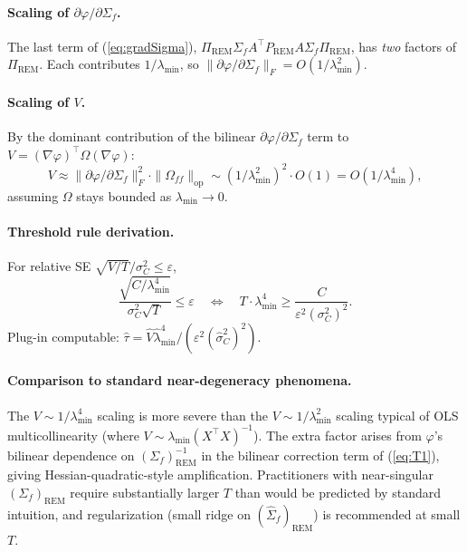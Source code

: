 \documentclass[11pt,letterpaper]{article}
\theoremstyle{remark}
\newcommand{\REM}{\mathrm{REM}}
\newcommand{\Sigmaf}{\Sigma_f}
\newcommand{\PiREM}{\Pi_{\REM}}
\newcommand{\PREM}{P_{\REM}}
\newcommand{\sigC}{\sigma^2_C}
\newcommand{\hatsigC}{\widehat{\sigma}^2_C}
\newcommand{\Sfhat}{\widehat{\Sigma}_f}
\begin{document}
\paragraph{Scaling of $\partial \varphi / \partial \Sigmaf$.} The last term of (\ref{eq:gradSigma}), $\PiREM \Sigmaf A^\top \PREM A \Sigmaf \PiREM$, has \emph{two} factors of $\PiREM$. Each contributes $1/\lambda_{\min}$, so $\|\partial \varphi / \partial \Sigmaf\|_F = O(1/\lambda_{\min}^2)$.

\paragraph{Scaling of $V$.} By the dominant contribution of the bilinear $\partial \varphi / \partial \Sigmaf$ term to $V = (\nabla \varphi)^\top \Omega (\nabla \varphi)$:
\begin{equation*}
V \approx \|\partial \varphi / \partial \Sigmaf\|_F^2 \cdot \|\Omega_{ff}\|_{\mathrm{op}} \sim (1/\lambda_{\min}^2)^2 \cdot O(1) = O(1/\lambda_{\min}^4),
\end{equation*}
assuming $\Omega$ stays bounded as $\lambda_{\min} \to 0$.

\paragraph{Threshold rule derivation.} For relative SE $\sqrt{V/T}/\sigC \le \varepsilon$,
\begin{equation*}
\frac{\sqrt{C/\lambda_{\min}^4}}{\sigC \sqrt{T}} \le \varepsilon \quad \Longleftrightarrow \quad T \cdot \lambda_{\min}^4 \ge \frac{C}{\varepsilon^2 (\sigC)^2}.
\end{equation*}
Plug-in computable: $\widehat\tau = \widehat{V} \widehat\lambda_{\min}^4 / (\varepsilon^2 (\hatsigC)^2)$.

\paragraph{Comparison to standard near-degeneracy phenomena.} The $V \sim 1/\lambda_{\min}^4$ scaling is more severe than the $V \sim 1/\lambda_{\min}^2$ scaling typical of OLS multicollinearity (where $V \sim \lambda_{\min}(X^\top X)^{-1}$). The extra factor arises from $\varphi$'s bilinear dependence on $(\Sigmaf)_\REM^{-1}$ in the bilinear correction term of (\ref{eq:T1}), giving Hessian-quadratic-style amplification. Practitioners with near-singular $(\Sigmaf)_\REM$ require substantially larger $T$ than would be predicted by standard intuition, and regularization (small ridge on $(\Sfhat)_\REM$) is recommended at small $T$.
\end{document}
